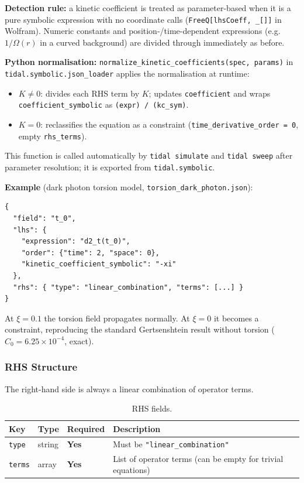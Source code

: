 \textbf{Detection rule:} a kinetic coefficient is treated as parameter-based when
it is a pure symbolic expression with no coordinate calls
(\texttt{FreeQ[lhsCoeff, \_[]]} in Wolfram).  Numeric constants and
position-/time-dependent expressions (e.g.\ $1/\Omega(r)$ in a curved background)
are divided through immediately as before.

\textbf{Python normalisation:}
\texttt{normalize\_kinetic\_coefficients(spec, params)} in
\texttt{tidal.symbolic.json\_loader} applies the normalisation at runtime:
\begin{itemize}
  \item $K \neq 0$: divides each RHS term by $K$; updates \texttt{coefficient} and
    wraps \texttt{coefficient\_symbolic} as \texttt{(expr) / (kc\_sym)}.
  \item $K = 0$: reclassifies the equation as a constraint
    (\texttt{time\_derivative\_order = 0}, empty \texttt{rhs\_terms}).
\end{itemize}
This function is called automatically by \texttt{tidal simulate} and
\texttt{tidal sweep} after parameter resolution; it is exported from
\texttt{tidal.symbolic}.

\textbf{Example} (dark photon torsion model, \texttt{torsion\_dark\_photon.json}):

\begin{lstlisting}[style=json]
{
  "field": "t_0",
  "lhs": {
    "expression": "d2_t(t_0)",
    "order": {"time": 2, "space": 0},
    "kinetic_coefficient_symbolic": "-xi"
  },
  "rhs": { "type": "linear_combination", "terms": [...] }
}
\end{lstlisting}

At $\xi = 0.1$ the torsion field propagates normally.
At $\xi = 0$ it becomes a constraint, reproducing the standard
Gertsenshtein result without torsion ($C_0 = 6.25 \times 10^{-4}$, exact).

\subsubsection{RHS Structure}
\label{sec:json-rhs}

The right-hand side is always a linear combination of operator terms.

\begin{table}[htbp]
\centering
\caption{RHS fields.}
\label{tab:json-rhs}
\begin{tabular}{@{}llll@{}}
\toprule
Key & Type & Required & Description \\
\midrule
\texttt{type}  & string & \textbf{Yes} & Must be \texttt{"linear\_combination"} \\
\texttt{terms} & array  & \textbf{Yes} & List of operator terms (can be empty for trivial equations) \\
\bottomrule
\end{tabular}
\end{table}

